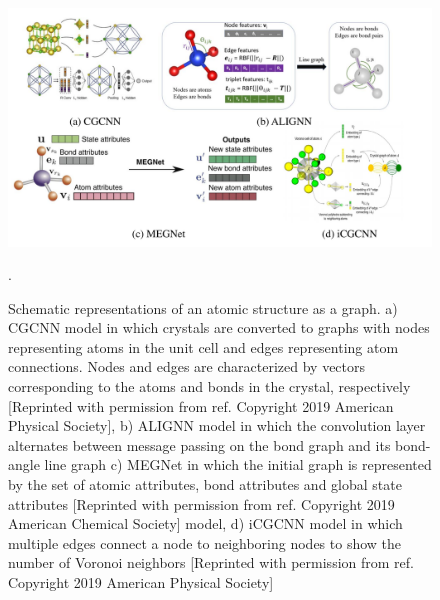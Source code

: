 \documentclass[pdflatex,sn-mathphys]{sn-jnl}%
\theoremstyle{thmstyleone}%
\theoremstyle{thmstyletwo}%
\theoremstyle{thmstylethree}%
\begin{document}
\begin{figure}
    \centering
    \includegraphics[trim={0 .5cm 0 1cm},clip,width=1.0\textwidth]{Figures/Fig2.pdf}
    \caption{Schematic representations of an atomic structure as a graph. a) CGCNN model in which  crystals are
converted to graphs with nodes representing atoms in the unit cell and edges representing atom connections. Nodes and edges are characterized by vectors corresponding to the atoms and bonds in the crystal, respectively [Reprinted with permission from ref. \cite{xie2018crystal} Copyright 2019 American Physical Society], b) ALIGNN \cite{choudhary2021atomistic} model in which the convolution layer alternates between message passing on the bond graph and its bond-angle line graph c) MEGNet in which the initial graph is represented by the set of atomic attributes, bond attributes and global state attributes  [Reprinted with permission from ref. \cite{chen2019graph} Copyright 2019 American Chemical Society] model, d) iCGCNN model in which multiple edges connect a node to neighboring nodes to show the number of Voronoi neighbors [Reprinted with permission from ref. \cite{park2020developing} Copyright 2019 American Physical Society]}.
\end{figure}


 
\end{document}
